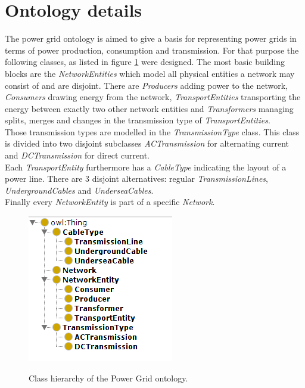 \section{Ontology details}

The power grid ontology is aimed to give a basis for representing power grids in terms of power production, consumption and transmission. For that purpose the following classes, as listed in figure \ref{fig:classes} were designed.
The most basic building blocks are the \textit{NetworkEntities} which model all physical entities 
a network may consist of and are disjoint. There are \textit{Producers} adding power to the network, \textit{Consumers} drawing energy from the network, \textit{TransportEntities} transporting the energy between exactly two other network entities and \textit{Transformers} managing splits, merges and changes in the transmission type of \textit{TransportEntities}. \\
Those transmission types are modelled in the \textit{TransmissionType} class. This class is divided into two disjoint subclasses \textit{ACTransmission} for alternating current and \textit{DCTransmission} for direct current. \\
Each \textit{TransportEntity} furthermore has a \textit{CableType} indicating the layout of a power line. There are 3 disjoint alternatives: regular \textit{TransmissionLines}, \textit{UndergroundCables} and \textit{UnderseaCables}. \\
Finally every \textit{NetworkEntity} is part of a specific \textit{Network}.

\begin{figure}
\centering
\includegraphics[scale=.75]{img/classes.png} 
\label{fig:classes}
\caption{Class hierarchy of the Power Grid ontology.}
\end{figure}
